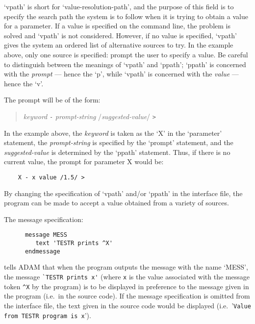 `vpath' is short for `value-resolution-path', and the purpose of this field is
to specify the search path the system is to follow when it is trying to obtain
a value for a parameter.
If a value is specified on the command line, the problem is solved and `vpath'
is not considered.
However, if no value is specified, `vpath' gives the system an ordered list of
alternative sources to try.
In the example above, only one source is specified: prompt the user to specify
a value.
Be careful to distinguish between the meanings of `vpath' and `ppath';
`ppath' is concerned with the {\em prompt} --- hence the `p', while `vpath' is
concerned with the {\em value} --- hence the `v'.

The prompt will be of the form:
\begin{quote}
{\em keyword}\/ \verb/-/ {\em prompt-string} /{\em suggested-value}/ \verb/>/
\end{quote}
In the example above, the {\em keyword} is taken as the `X' in the `parameter'
statement, the {\em prompt-string} is specified by the `prompt' statement, and
the {\em suggested-value} is determined by the `ppath' statement.
Thus, if there is no current value, the prompt for parameter X would be:

\begin{small}
\begin{verbatim}
    X - x value /1.5/ >
\end{verbatim}
\end{small}

By changing the specification of `vpath' and/or `ppath' in the interface file,
the program can be made to accept a value obtained from a variety of sources.

The message specification:

\begin{small}
\begin{verbatim}
      message MESS
         text 'TESTR prints ^X'
      endmessage
\end{verbatim}
\end{small}

tells ADAM that when the program outputs the message with the name `MESS',
the message \verb+`TESTR prints x'+ (where \verb+x+ is the value associated
with the message token \verb+^X+ by the program) is to be displayed in
preference to the message given in the program (i.e.\ in the source code).
If the message specification is omitted from the interface file, the text given
in the source code would be displayed
(i.e.\ '\verb+Value from TESTR program is x+').

